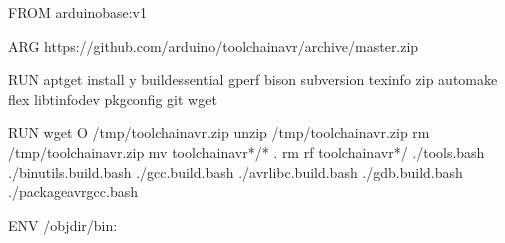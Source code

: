 \documentclass[letterpaper,10pt,english,openany,oneside]{sphinxmanual}
\begin{document}
\begin{sphinxVerbatim}[commandchars=\\\{\},numbers=left,firstnumber=1,stepnumber=1]
FROM arduino\PYGZus{}base:v1

ARG https://github.com/arduino/toolchain\PYGZhy{}avr/archive/master.zip

RUN apt\PYGZhy{}get install \PYGZhy{}y 
        build\PYGZhy{}essential 
        gperf 
        bison 
        subversion 
        texinfo 
        zip 
        automake 
        flex 
        libtinfo\PYGZhy{}dev 
        pkg\PYGZhy{}config 
        git 
        wget

RUN wget  \PYGZhy{}O /tmp/toolchain\PYGZhy{}avr.zip  
    unzip /tmp/toolchain\PYGZhy{}avr.zip  
    rm /tmp/toolchain\PYGZhy{}avr.zip  
    mv toolchain\PYGZhy{}avr*/* .  
    rm \PYGZhy{}rf toolchain\PYGZhy{}avr*/  
    ./tools.bash  
    ./binutils.build.bash  
    ./gcc.build.bash  
    ./avr\PYGZhy{}libc.build.bash  
    ./gdb.build.bash  
    ./package\PYGZhy{}avr\PYGZhy{}gcc.bash

ENV /objdir/bin:
\end{sphinxVerbatim}
\end{document}
